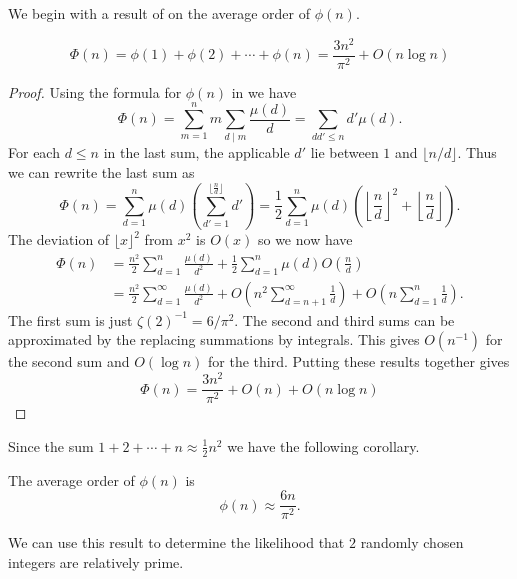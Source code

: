 \medskip
We begin with a result of {\Mertens} \cite{Mertens1874-cf} on the average
order of $\phi(n)$.

\begin{proposition}[Mertens]
\label{Mertens:phi:Prop}
\[
\Phi(n) = \phi(1) + \phi(2) + \cdots + \phi(n) =
\frac{3 n^2}{\pi^2} + O(n \log n)
\]
\end{proposition}

\begin{proof}
Using the formula for $\phi(n)$ in  we have
\[
\Phi(n) = \sum_{m=1}^{n} m \sum_{d\mid m}\frac{\mu(d)}{d} =
\sum_{d d' \le n} d' \mu(d).
\]
For each $d \le n$ in the last sum, the applicable $d'$ lie
between $1$ and $\lfloor n/d\rfloor$.  Thus we can rewrite the
last sum as
\[
\Phi(n) = \sum_{d=1}^{n} \mu(d)
\left(\sum_{d'=1}^{\lfloor\frac{n}{d}\rfloor} d'\right) =
\frac{1}{2}\sum_{d=1}^{n} \mu(d)
\left(\left\lfloor\frac{n}{d}\right\rfloor^2 +
    \left\lfloor\frac{n}{d}\right\rfloor\right).
\]
The deviation of $\lfloor x\rfloor^2$ from $x^2$ is $O(x)$ so we now have
\[
\begin{aligned}
  \Phi(n) &= \frac{n^2}{2}\sum_{d=1}^{n}\frac{\mu(d)}{d^2} + 
    \frac{1}{2} \sum_{d=1}^{n} \mu(d) O(\frac{n}{d}) \\
  & = \frac{n^2}{2}\sum_{d=1}^{\infty}\frac{\mu(d)}{d^2} +
    O\left(n^2 \sum_{d=n+1}^{\infty} \frac{1}{d}\right) +
    O\left(n \sum_{d=1}^{n} \frac{1}{d}\right).
\end{aligned}
\]
The first sum is just $\zeta(2)^{-1} = 6/\pi^2$.  The second and
third sums can be approximated by the replacing summations by
integrals.  This gives $O(n^{-1})$ for the second sum and $O(\log n)$
for the third.  Putting these results together gives
\[
\Phi(n) = \frac{3 n^2}{\pi^2} + O(n) + O(n \log n)
\]
\end{proof}

Since the sum $1 + 2 + \cdots + n \approx \frac{1}{2} n^2$ we have the
following corollary.

\begin{proposition}\label{Totient:Average:Prop}
The average order of $\phi(n)$ is 
\[
\phi(n) \approx \frac{6n}{\pi^2}.
\]
\end{proposition}

We can use this result to determine the likelihood that $2$ randomly
chosen integers are relatively prime.  

